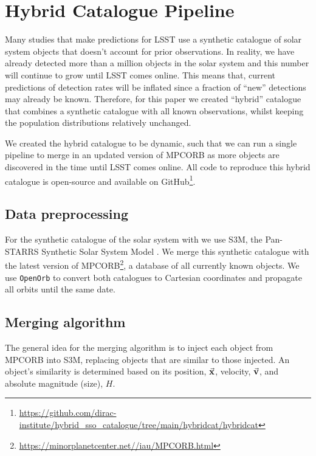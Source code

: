 \documentclass[twocolumn]{aastex631}
\newcommand{\sss}{S3M}
\newcommand{\mpco}{MPCORB}
\begin{document}

{}

\restartappendixnumbering

\allowdisplaybreaks
\appendix

\section{Hybrid Catalogue Pipeline}\label{app:hybrid}
Many studies that make predictions for LSST use a synthetic catalogue of solar system objects that doesn't account for prior observations. In reality, we have already detected more than a million objects in the solar system and this number will continue to grow until LSST comes online. This means that, current predictions of detection rates will be inflated since a fraction of ``new'' detections may already be known. Therefore, for this paper we created ``hybrid'' catalogue that combines a synthetic catalogue with all known observations, whilst keeping the population distributions relatively unchanged.

We created the hybrid catalogue to be dynamic, such that we can run a single pipeline to merge in an updated version of \mpco{} as more objects are discovered in the time until LSST comes online. All code to reproduce this hybrid catalogue is open-source and available on GitHub\footnote{\url{https://github.com/dirac-institute/hybrid_sso_catalogue/tree/main/hybridcat/hybridcat}}.

\subsection{Data preprocessing}
For the synthetic catalogue of the solar system with we use \sss{}, the Pan-STARRS Synthetic Solar System Model \citep[\sss{}][]{Grav+2011}. We merge this synthetic catalogue with the latest version of \mpco{}\footnote{\url{https://minorplanetcenter.net//iau/MPCORB.html}}, a database of all currently known objects. We use \texttt{OpenOrb} \citep{Granvik+2009} to convert both catalogues to Cartesian coordinates and propagate all orbits until the same date.

\subsection{Merging algorithm}
The general idea for the merging algorithm is to inject each object from \mpco{} into \sss{}, replacing objects that are similar to those injected. An object's similarity is determined based on its position, $\va{x}$, velocity, $\va{v}$, and absolute magnitude (size), ${H}$.
\end{document}
